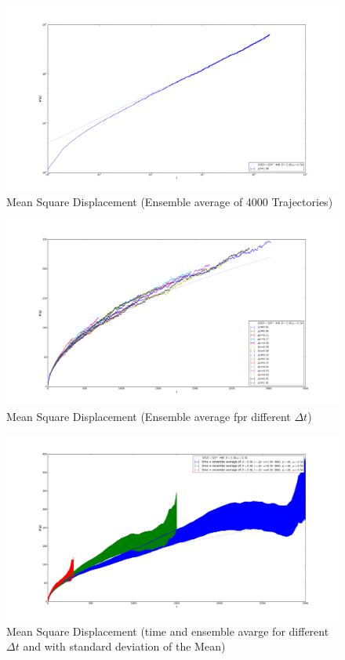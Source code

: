 \documentclass[
  a4paper,BCOR10mm,oneside,
  bibtotoc,idxtotoc,
  headsepline,footsepline,%
  fleqn,openbib
]{scrbook}
\begin{document}
\begin{figure}[h]
\includegraphics[width=\textwidth]{./msd_ensemble_4000particles_log.pdf}
\caption{Mean Square Displacement (Ensemble average of 4000 Trajectories)}
 \centering
\end{figure}

\begin{figure}[h]
\includegraphics[width=\textwidth]{./msd_ensemble_dt_nostd_lin.pdf}
\caption{Mean Square Displacement (Ensemble average fpr different $\Delta t$)}
 \centering
\end{figure}

\begin{figure}[h]
\includegraphics[width=\textwidth]{./msd_time_ensemble_dt_lin.pdf}
\caption{Mean Square Displacement (time and ensemble avarge for different $ \Delta t$ and with standard deviation of the Mean)}
 \centering
\end{figure}
\end{document}
